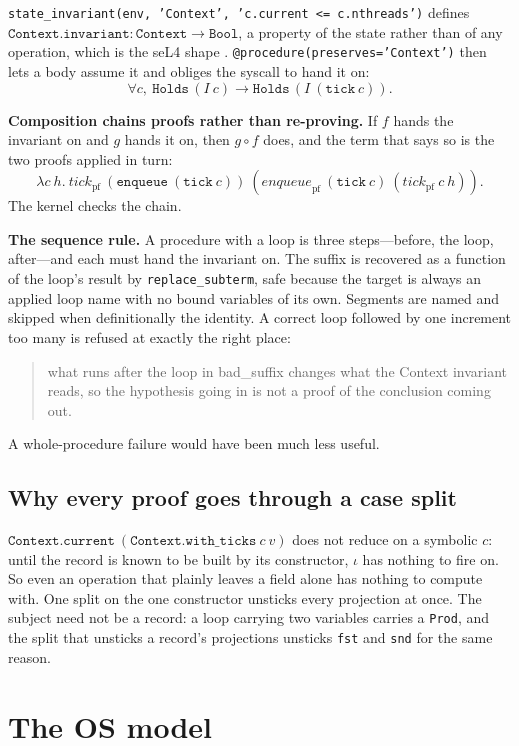 \documentclass[11pt]{article}
\newcommand{\code}[1]{\texttt{#1}}
\begin{document}
\code{state\_invariant(env, 'Context', 'c.current <= c.nthreads')} defines
$\code{Context.invariant} : \code{Context} \to \code{Bool}$, a property of the
state rather than of any operation, which is the seL4 shape \cite{klein2009}.
\code{@procedure(preserves='Context')} then lets a body assume it and obliges
the syscall to hand it on:
\[
  \forall c,\ \code{Holds}\,(I\ c) \to \code{Holds}\,(I\ (\code{tick}\ c)).
\]

\textbf{Composition chains proofs rather than re-proving.} If $f$ hands the
invariant on and $g$ hands it on, then $g \circ f$ does, and the term that
says so is the two proofs applied in turn:
\[
  \lambda c\ h.\ \mathit{tick}_{\mathrm{pf}}\ (\code{enqueue}\ (\code{tick}\ c))\
  (\mathit{enqueue}_{\mathrm{pf}}\ (\code{tick}\ c)\ (\mathit{tick}_{\mathrm{pf}}\ c\ h)).
\]
The kernel checks the chain.

\textbf{The sequence rule.} A procedure with a loop is three steps---before,
the loop, after---and each must hand the invariant on. The suffix is recovered
as a function of the loop's result by \code{replace\_subterm}, safe because
the target is always an applied loop name with no bound variables of its own.
Segments are named and skipped when definitionally the identity. A correct
loop followed by one increment too many is refused at exactly the right
place:
\begin{quote}\small\ttfamily
what runs after the loop in bad\_suffix changes what the Context invariant
reads, so the hypothesis going in is not a proof of the conclusion coming out.
\end{quote}
A whole-procedure failure would have been much less useful.

\subsection{Why every proof goes through a case split}
\label{sec:casesplit}

$\code{Context.current}\ (\code{Context.with\_ticks}\ c\ v)$ does not reduce
on a symbolic $c$: until the record is known to be built by its constructor,
$\iota$ has nothing to fire on. So even an operation that plainly leaves a
field alone has nothing to compute with. One split on the one constructor
unsticks every projection at once. The subject need not be a record: a loop
carrying two variables carries a \code{Prod}, and the split that unsticks a
record's projections unsticks \code{fst} and \code{snd} for the same reason.

\section{The OS model}
\label{sec:os}
\end{document}
